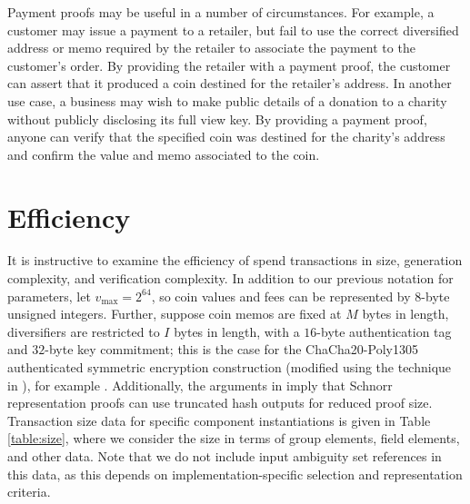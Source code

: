 \documentclass{llncs}
\begin{document}
Payment proofs may be useful in a number of circumstances.
For example, a customer may issue a payment to a retailer, but fail to use the correct diversified address or memo required by the retailer to associate the payment to the customer's order.
By providing the retailer with a payment proof, the customer can assert that it produced a coin destined for the retailer's address.
In another use case, a business may wish to make public details of a donation to a charity without publicly disclosing its full view key.
By providing a payment proof, anyone can verify that the specified coin was destined for the charity's address and confirm the value and memo associated to the coin.


\section{Efficiency}

It is instructive to examine the efficiency of spend transactions in size, generation complexity, and verification complexity.
In addition to our previous notation for parameters, let $v_{\text{max}} = 2^{64}$, so coin values and fees can be represented by $8$-byte unsigned integers.
Further, suppose coin memos are fixed at $M$ bytes in length, diversifiers are restricted to $I$ bytes in length, with a $16$-byte authentication tag and $32$-byte key commitment; this is the case for the ChaCha20-Poly1305 authenticated symmetric encryption construction (modified using the technique in \cite{key_commitment}), for example \cite{chachapoly}.
Additionally, the arguments in \cite{schnorr} imply that Schnorr representation proofs can use truncated hash outputs for reduced proof size.
Transaction size data for specific component instantiations is given in Table \ref{table:size}, where we consider the size in terms of group elements, field elements, and other data.
Note that we do not include input ambiguity set references in this data, as this depends on implementation-specific selection and representation criteria.
\end{document}
